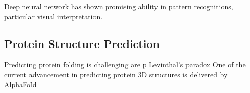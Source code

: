 Deep neural network has shown promising ability in pattern recognitions, particular visual interpretation.
\par 

\subsection{Protein Structure Prediction}
Predicting protein folding is challenging are p Levinthal's paradox One of the current advancement in predicting protein 3D structures is delivered by AlphaFold